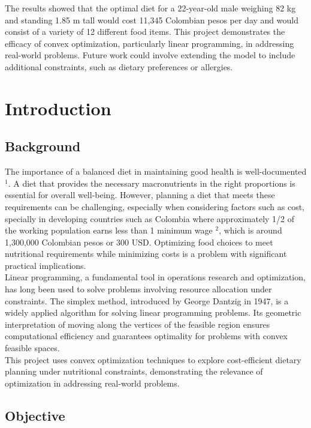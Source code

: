\documentclass[10pt]{article}
\begin{document}
The results showed that the optimal diet for a 22-year-old male weighing 82 kg and standing 1.85 m tall would cost 11,345 Colombian pesos per day and would consist of a variety of 12 different food items. This project demonstrates the efficacy of convex optimization, particularly linear programming, in addressing real-world problems. Future work could involve extending the model to include additional constraints, such as dietary preferences or allergies.\\

\section{Introduction}

\subsection{Background}

The importance of a balanced diet in maintaining good health is well-documented $^1$. A diet that provides the necessary macronutrients in the right proportions is essential for overall well-being. However, planning a diet that meets these requirements can be challenging, especially when considering factors such as cost, specially 
in developing countries such as Colombia where approximately 1/2 of the working population earns less than 1 minimum wage $^2$, which is around 1,300,000 Colombian pesos or 300 USD. Optimizing food choices to meet nutritional requirements while minimizing costs is a problem with significant practical implications.\\

Linear programming, a fundamental tool in operations research and optimization, has long been used to solve problems involving resource allocation under constraints. The simplex method, introduced by George Dantzig in 1947, is a widely applied algorithm for solving linear programming problems. Its geometric interpretation of moving along the vertices of the feasible region ensures computational efficiency and guarantees optimality for problems with convex feasible spaces.\\

This project uses convex optimization techniques to explore cost-efficient dietary planning under nutritional constraints, demonstrating the relevance of optimization in addressing real-world problems.


\subsection{Objective}
\end{document}

